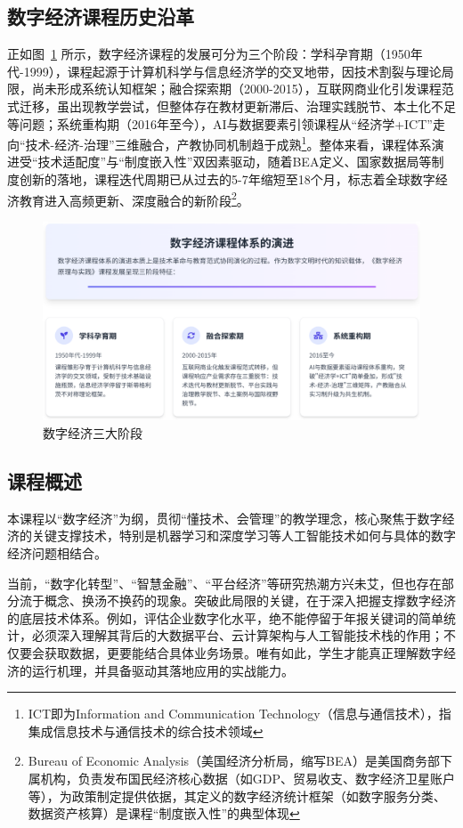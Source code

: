 \documentclass[lang=cn,12pt,a4paper]{elegantpaper}
\begin{document}
\subsection{数字经济课程历史沿革} \label{sec:history}
正如图~\ref{fig:dig_eco} 所示，数字经济课程的发展可分为三个阶段：学科孕育期（1950年代-1999），课程起源于计算机科学与信息经济学的交叉地带，因技术割裂与理论局限，尚未形成系统认知框架；融合探索期（2000-2015），互联网商业化引发课程范式迁移，虽出现教学尝试，但整体存在教材更新滞后、治理实践脱节、本土化不足等问题；系统重构期（2016年至今），AI与数据要素引领课程从“经济学+ICT”走向“技术-经济-治理”三维融合，产教协同机制趋于成熟\footnote{ICT即为Information and Communication Technology（信息与通信技术），指集成信息技术与通信技术的综合技术领域}。整体来看，课程体系演进受“技术适配度”与“制度嵌入性”双因素驱动，随着BEA定义、国家数据局等制度创新的落地，课程迭代周期已从过去的5-7年缩短至18个月，标志着全球数字经济教育进入高频更新、深度融合的新阶段\footnote{Bureau of Economic Analysis（美国经济分析局，缩写BEA）是美国商务部下属机构，负责发布国民经济核心数据（如GDP、贸易收支、数字经济卫星账户等），为政策制定提供依据，其定义的数字经济统计框架（如数字服务分类、数据资产核算）是课程“制度嵌入性”的典型体现}。
\begin{figure}[H]
    \centering
    \includegraphics[width=1\linewidth]{his_dig.png}
    \caption{数字经济三大阶段}
    \label{fig:dig_eco}
\end{figure}

\subsection{课程概述} \label{sec:overview}
本课程以“数字经济”为纲，贯彻“懂技术、会管理”的教学理念，核心聚焦于数字经济的关键支撑技术，特别是机器学习和深度学习等人工智能技术如何与具体的数字经济问题相结合。

当前，“数字化转型”、“智慧金融”、“平台经济”等研究热潮方兴未艾，但也存在部分流于概念、换汤不换药的现象。突破此局限的关键，在于深入把握支撑数字经济的底层技术体系。例如，评估企业数字化水平，绝不能停留于年报关键词的简单统计，必须深入理解其背后的大数据平台、云计算架构与人工智能技术栈的作用；不仅要会获取数据，更要能结合具体业务场景。唯有如此，学生才能真正理解数字经济的运行机理，并具备驱动其落地应用的实战能力。
\end{document}
